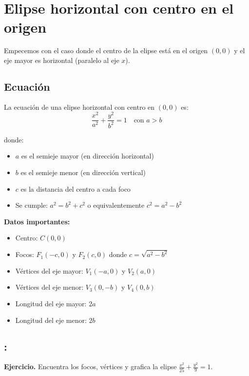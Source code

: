 \documentclass[12pt,a4paper]{article}
\begin{document}
	\section{Elipse horizontal con centro en el origen}

	Empecemos con el caso donde el centro de la elipse está en el origen $(0,0)$ y el eje mayor es horizontal (paralelo al eje $x$).

	\subsection*{Ecuación}

	La ecuación de una elipse horizontal con centro en $(0,0)$ es:
	\[
	\boxed{\frac{x^2}{a^2}+\frac{y^2}{b^2}=1} \quad\text{con }a>b
	\]

	donde:
	\begin{itemize}
		\item $a$ es el semieje mayor (en dirección horizontal)
		\item $b$ es el semieje menor (en dirección vertical)
		\item $c$ es la distancia del centro a cada foco
		\item Se cumple: $\boxed{a^2=b^2+c^2}$ o equivalentemente $\boxed{c^2=a^2-b^2}$
	\end{itemize}

	\textbf{Datos importantes:}
	\begin{itemize}
		\item Centro: $C(0,0)$
		\item Focos: $F_1(-c,0)$ y $F_2(c,0)$ donde $c=\sqrt{a^2-b^2}$
		\item Vértices del eje mayor: $V_1(-a,0)$ y $V_2(a,0)$
		\item Vértices del eje menor: $V_3(0,-b)$ y $V_4(0,b)$
		\item Longitud del eje mayor: $2a$
		\item Longitud del eje menor: $2b$
	\end{itemize}

	\subsection*{{\color{blue!50!red}{Ejemplo 1}}: \color{blue!80!black}{Elipse horizontal con centro en el origen}}

	\textbf{Ejercicio.} Encuentra los focos, vértices y grafica la elipse $\displaystyle\frac{x^2}{25}+\frac{y^2}{9}=1$.

	\bigskip
\end{document}

